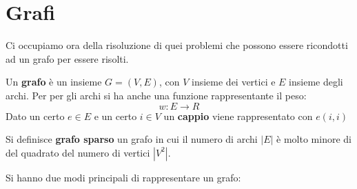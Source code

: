 \documentclass[a4paper,12pt, oneside]{book}
\begin{document}
\chapter{Grafi}
Ci occupiamo ora della risoluzione di quei problemi che possono essere
ricondotti ad un grafo per essere risolti.
\begin{definizione}
  Un \textbf{grafo} è un insieme $G=(V,E)$, con $V$ insieme dei vertici
  e $E$ insieme degli archi. Per per gli archi si ha anche una funzione
  rappresentante il peso:
  \[w:E\to\mathit{R}\]
  Dato un certo $e\in E$ e un certo $i\in V$ un \textbf{cappio} viene
  rappresentato con $e(i,i)$
\end{definizione}
\begin{definizione}
  Si definisce \textbf{grafo sparso} un grafo in cui il numero di
  archi $|E|$ è molto minore di del quadrato del numero di vertici
  $|V^2|$. 
\end{definizione}
Si hanno due modi principali di rappresentare un grafo:
\end{document}

